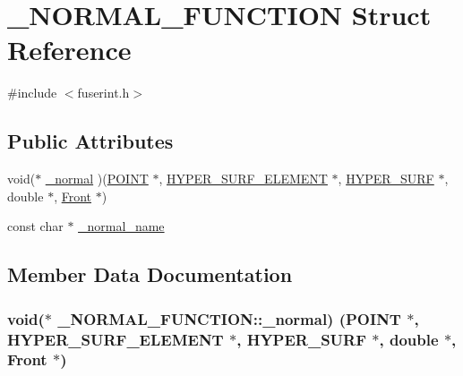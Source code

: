 \hypertarget{struct___n_o_r_m_a_l___f_u_n_c_t_i_o_n}{}\section{\+\_\+\+N\+O\+R\+M\+A\+L\+\_\+\+F\+U\+N\+C\+T\+I\+ON Struct Reference}
\label{struct___n_o_r_m_a_l___f_u_n_c_t_i_o_n}


{\ttfamily \#include $<$fuserint.\+h$>$}

\subsection*{Public Attributes}
\begin{DoxyCompactItemize}
\item 
void($\ast$ \hyperlink{struct___n_o_r_m_a_l___f_u_n_c_t_i_o_n_a4c7460f0cb140c24522c7f3205b61dc5}{\+\_\+normal} )(\hyperlink{int_8h_a3a87c5c9d0146e30a4bf720f701e5a63}{P\+O\+I\+NT} $\ast$, \hyperlink{int_8h_a17e21ae7174174d7a55516f8c9a8f12f}{H\+Y\+P\+E\+R\+\_\+\+S\+U\+R\+F\+\_\+\+E\+L\+E\+M\+E\+NT} $\ast$, \hyperlink{int_8h_acef50fa4757ce0d3f75c97fab5a175bc}{H\+Y\+P\+E\+R\+\_\+\+S\+U\+RF} $\ast$, double $\ast$, \hyperlink{fdecs_8h_ac32202b798f848095c489cfd04c4ca5f}{Front} $\ast$)
\item 
const char $\ast$ \hyperlink{struct___n_o_r_m_a_l___f_u_n_c_t_i_o_n_aa6efac643e00ad3aa6c448d2efb03103}{\+\_\+normal\+\_\+name}
\end{DoxyCompactItemize}


\subsection{Member Data Documentation}
\subsubsection[{\texorpdfstring{\+\_\+normal}{_normal}}]{\setlength{\rightskip}{0pt plus 5cm}void($\ast$ \+\_\+\+N\+O\+R\+M\+A\+L\+\_\+\+F\+U\+N\+C\+T\+I\+O\+N\+::\+\_\+normal) ({\bf P\+O\+I\+NT} $\ast$, {\bf H\+Y\+P\+E\+R\+\_\+\+S\+U\+R\+F\+\_\+\+E\+L\+E\+M\+E\+NT} $\ast$, {\bf H\+Y\+P\+E\+R\+\_\+\+S\+U\+RF} $\ast$, double $\ast$, {\bf Front} $\ast$)}\hypertarget{struct___n_o_r_m_a_l___f_u_n_c_t_i_o_n_a4c7460f0cb140c24522c7f3205b61dc5}{}\label{struct___n_o_r_m_a_l___f_u_n_c_t_i_o_n_a4c7460f0cb140c24522c7f3205b61dc5}
